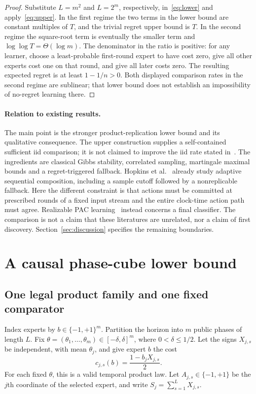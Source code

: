 \documentclass[11pt]{article}
\newcommand{\1}{\mathbf 1}
\begin{document}
\begin{proof}
Substitute $L=m^2$ and $L=2^m$, respectively, in~\eqref{eq:lower}
and apply~\eqref{eq:upper}. In the first regime the two terms in
the lower bound are constant multiples of $T$, and the trivial regret
upper bound is $T$. In the second regime the square-root term is
eventually the smaller term and $\log\log T=\Theta(\log m)$.
The denominator in the ratio is positive: for any learner, choose a
least-probable first-round expert to have cost zero, give all other
experts cost one on that round, and give all later costs zero.
The resulting expected regret is at least $1-1/n>0$.
Both displayed comparison rates in the second regime are sublinear;
that lower bound does not establish an impossibility of no-regret
learning there.
\end{proof}

\paragraph{Relation to existing results.}
The main point is the stronger product-replication lower bound and
its qualitative consequence. The upper construction supplies a
self-contained sufficient iid comparison; it is not claimed to improve
the iid rate stated in~\cite{ABB}. The ingredients are classical Gibbs
stability, correlated sampling, martingale maximal bounds and a
regret-triggered fallback. Hopkins et al.~\cite{HIKLY} already study
adaptive sequential composition, including a sample cutoff followed by
a nonreplicable fallback. Here the different constraint is that actions
must be committed at prescribed rounds of a fixed input stream and the
entire clock-time action path must agree. Realizable PAC
learning~\cite{LMPS} instead concerns a final classifier.
The comparison is not a claim that these literatures are unrelated,
nor a claim of first discovery. Section~\ref{sec:discussion} specifies
the remaining boundaries.

\section{A causal phase-cube lower bound}

\subsection{One legal product family and one fixed comparator}

Index experts by $b\in\{-1,+1\}^m$. Partition the horizon into $m$
public phases of length $L$. Fix
$\theta=(\theta_1,\ldots,\theta_m)\in[-\delta,\delta]^m$,
where $0<\delta\le1/2$. Let the signs $X_{j,s}$ be independent,
with mean $\theta_j$, and give expert $b$ the cost
\begin{equation}\label{eq:cube}
 c_{j,s}(b)=\frac{1-b_jX_{j,s}}2.
\end{equation}
For each fixed $\theta$, this is a valid temporal product law.
Let $A_{j,s}\in\{-1,+1\}$ be the $j$th coordinate of the selected
expert, and write $S_j=\sum_{s=1}^L X_{j,s}$.
\end{document}
